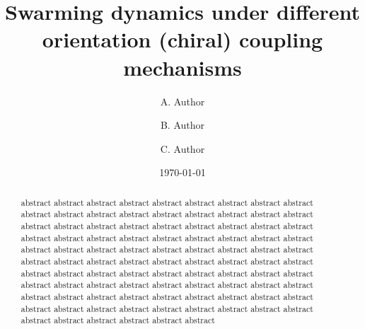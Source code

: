 \documentclass[%
 aip,
 amsmath,amssymb,
 reprint,%
]{revtex4-1}
\begin{document}

\title[Swarming dynamics under different orientation (chiral) coupling mechanisms]{Swarming dynamics under different orientation (chiral) coupling mechanisms\\ \;}
\author{A. Author}
\author{B. Author}%
%

\author{C. Author}
%

\date{\today}%

\begin{abstract}
    abstract abstract abstract abstract abstract abstract abstract abstract abstract abstract abstract abstract abstract abstract abstract abstract abstract abstract abstract abstract abstract abstract abstract abstract abstract abstract abstract abstract abstract abstract abstract abstract abstract abstract abstract abstract abstract abstract abstract abstract abstract abstract abstract abstract abstract abstract abstract abstract abstract abstract abstract abstract abstract abstract abstract abstract abstract abstract abstract abstract abstract abstract abstract abstract abstract abstract abstract abstract abstract abstract abstract abstract abstract abstract abstract abstract abstract abstract abstract abstract abstract abstract abstract abstract abstract abstract abstract abstract abstract abstract abstract abstract abstract abstract abstract abstract 
\end{abstract}

\maketitle

\end{document}
